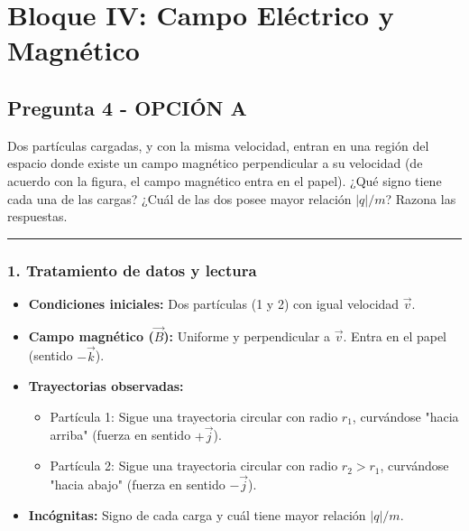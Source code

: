 \newpage
\section{Bloque IV: Campo Eléctrico y Magnético}
\label{sec:em_2016_jul_ext}
\subsection{Pregunta 4 - OPCIÓN A}
\label{subsec:4A_2016_jul_ext}
\begin{cajaenunciado}
Dos partículas cargadas, y con la misma velocidad, entran en una región del espacio donde existe un campo magnético perpendicular a su velocidad (de acuerdo con la figura, el campo magnético entra en el papel). ¿Qué signo tiene cada una de las cargas? ¿Cuál de las dos posee mayor relación $|q|/m$? Razona las respuestas.
\end{cajaenunciado}
\hrule

\subsubsection*{1. Tratamiento de datos y lectura}
\begin{itemize}
    \item \textbf{Condiciones iniciales:} Dos partículas (1 y 2) con igual velocidad $\vec{v}$.
    \item \textbf{Campo magnético ($\vec{B}$):} Uniforme y perpendicular a $\vec{v}$. Entra en el papel (sentido $-\vec{k}$).
    \item \textbf{Trayectorias observadas:}
        \begin{itemize}
            \item Partícula 1: Sigue una trayectoria circular con radio $r_1$, curvándose "hacia arriba" (fuerza en sentido $+\vec{j}$).
            \item Partícula 2: Sigue una trayectoria circular con radio $r_2 > r_1$, curvándose "hacia abajo" (fuerza en sentido $-\vec{j}$).
        \end{itemize}
    \item \textbf{Incógnitas:} Signo de cada carga y cuál tiene mayor relación $|q|/m$.
\end{itemize}


